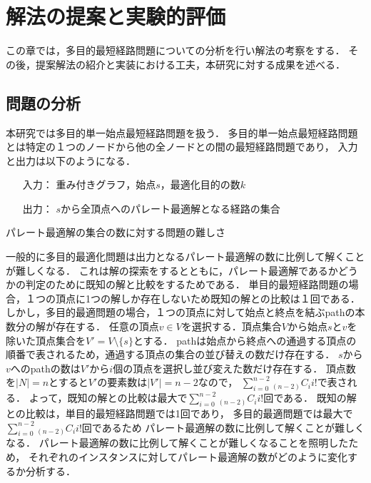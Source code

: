 \documentclass[12pt]{optlab-bachelor}
\begin{document}
%


\chapter{解法の提案と実験的評価}
この章では，多目的最短経路問題についての分析を行い解法の考察をする．
その後，提案解法の紹介と実装における工夫，本研究に対する成果を述べる．

\section{問題の分析}
本研究では多目的単一始点最短経路問題を扱う．
多目的単一始点最短経路問題とは特定の１つのノードから他の全ノードとの間の最短経路問題であり，
入力と出力は以下のようになる．
\begin{itemize}
  \item[入力：]重み付きグラフ，始点$s$，最適化目的の数$k$
  \item[出力：]$s$から全頂点へのパレート最適解となる経路の集合
\end{itemize}

\begin{description}
  \item[パレート最適解の集合の数に対する問題の難しさ]
\end{description}

一般的に多目的最適化問題は出力となるパレート最適解の数に比例して解くことが難しくなる．
これは解の探索をするとともに，パレート最適解であるかどうかの判定のために既知の解と比較をするためである．
単目的最短経路問題の場合，１つの頂点に1つの解しか存在しないため既知の解との比較は１回である．
しかし，多目的最適問題の場合，１つの頂点に対して始点と終点を結ぶpathの本数分の解が存在する．
任意の頂点$v \in V$を選択する．頂点集合$V$から始点$s$と$v$を除いた頂点集合を$V'=V \setminus \{s\}$とする．
pathは始点から終点への通過する頂点の順番で表されるため，通過する頂点の集合の並び替えの数だけ存在する．
$s$から$v$へのpathの数は$V'$から$i$個の頂点を選択し並び変えた数だけ存在する．
頂点数を$|N|=n$とすると$V'$の要素数は$|V'|=n-2$なので，
$\displaystyle \sum_{i=0}^{n-2} {}_{(n-2)}C_i i!$で表される．
よって，既知の解との比較は最大で$\displaystyle \sum_{i=0}^{n-2} {}_{(n-2)}C_i i!$回である．
既知の解との比較は，単目的最短経路問題では1回であり，
多目的最適問題では最大で$\displaystyle \sum_{i=0}^{n-2} {}_{(n-2)}C_i i!$回であるため
パレート最適解の数に比例して解くことが難しくなる．
パレート最適解の数に比例して解くことが難しくなることを照明したため，
それぞれのインスタンスに対してパレート最適解の数がどのように変化するか分析する．
\end{document}

